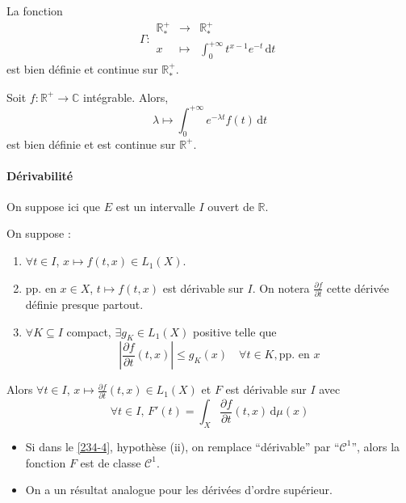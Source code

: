 
  \begin{example}
    \label{234-3}
    La fonction
    \[ \Gamma :
    \begin{array}{ccc}
      \mathbb{R}^+_* &\rightarrow& \mathbb{R}^+_* \\
      x &\mapsto& \int_{0}^{+\infty} t^{x-1} e^{-t} \, \mathrm{d}t
    \end{array}
    \]
    est bien définie et continue sur $\mathbb{R}^+_*$.
  \end{example}


  \begin{example}
    Soit $f : \mathbb{R}^+ \rightarrow \mathbb{C}$ intégrable. Alors,
    \[ \lambda \mapsto \int_0^{+\infty} e^{-\lambda t} f(t) \, \mathrm{d}t \]
    est bien définie et est continue sur $\mathbb{R}^+$.
  \end{example}

  \paragraph{Dérivabilité}


  On suppose ici que $E$ est un intervalle $I$ ouvert de $\mathbb{R}$.

  \begin{theorem}
    \label{234-4}
    On suppose :
    \begin{enumerate}[label={\bfseries(\roman*)}]
      \item $\forall t \in I$, $x \mapsto f(t,x) \in L_1(X)$.
      \item pp. en $x \in X$, $t \mapsto f(t,x)$ est dérivable sur $I$. On notera $\frac{\partial f}{\partial t}$ cette dérivée définie presque partout.
      \item $\forall K \subseteq I$ compact, $\exists g_K \in L_1(X)$ positive telle que
      \[ \left| \frac{\partial f}{\partial t}(t,x) \right| \leq g_K(x) \quad \forall t \in K, \text{pp. en } x \]
    \end{enumerate}
    Alors $\forall t \in I$, $x \mapsto \frac{\partial f}{\partial t}(t, x) \in L_1(X)$ et $F$ est dérivable sur $I$ avec
    \[ \forall t \in I, \, F'(t) = \int_X \frac{\partial f}{\partial t}(t, x) \, \mathrm{d}\mu(x) \]
  \end{theorem}

  \begin{remark}
    \begin{itemize}
      \item Si dans le \cref{234-4}, hypothèse (ii), on remplace ``dérivable'' par ``$\mathcal{C}^1$'', alors la fonction $F$ est de classe $\mathcal{C}^1$.
      \item On a un résultat analogue pour les dérivées d'ordre supérieur.
    \end{itemize}
  \end{remark}

